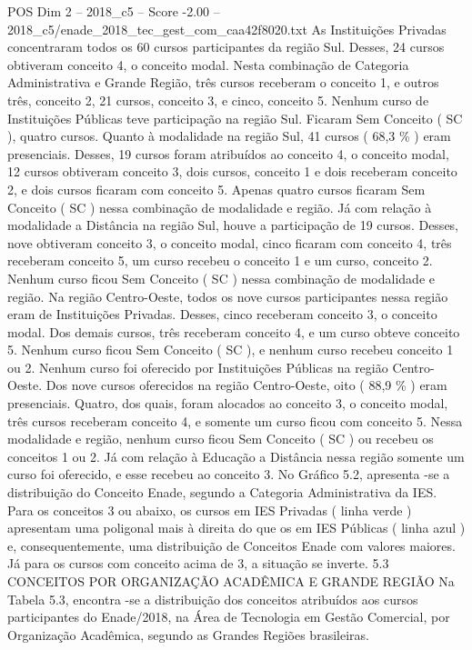 \begin{textsample}{POS Dim 2 – 2018\_c5 – Score -2.00 – 2018\_c5/enade\_2018\_tec\_gest\_com\_caa42f8020.txt}
As Instituições Privadas concentraram todos os 60 cursos participantes da região Sul.
Desses, 24 cursos obtiveram conceito 4, o conceito modal.
Nesta combinação de Categoria Administrativa e Grande Região, três cursos receberam o conceito 1, e outros três, conceito 2, 21 cursos, conceito 3, e cinco, conceito 5.
Nenhum curso de Instituições Públicas teve participação na região Sul.
Ficaram Sem Conceito ( SC ), quatro cursos.
Quanto à modalidade na região Sul, 41 cursos ( 68,3 \% ) eram presenciais.
Desses, 19 cursos foram atribuídos ao conceito 4, o conceito modal, 12 cursos obtiveram conceito 3, dois cursos, conceito 1 e dois receberam conceito 2, e dois cursos ficaram com conceito 5.
Apenas quatro cursos ficaram Sem Conceito ( SC ) nessa combinação de modalidade e região.
Já com relação à modalidade a Distância na região Sul, houve a participação de 19 cursos.
Desses, nove obtiveram conceito 3, o conceito modal, cinco ficaram com conceito 4, três receberam conceito 5, um curso recebeu o conceito 1 e um curso, conceito 2.
Nenhum curso ficou Sem Conceito ( SC ) nessa combinação de modalidade e região.
Na região Centro-Oeste, todos os nove cursos participantes nessa região eram de Instituições Privadas.
Desses, cinco receberam conceito 3, o conceito modal.
Dos demais cursos, três receberam conceito 4, e um curso obteve conceito 5.
Nenhum curso ficou Sem Conceito ( SC ), e nenhum curso recebeu conceito 1 ou 2.
Nenhum curso foi oferecido por Instituições Públicas na região Centro-Oeste.
Dos nove cursos oferecidos na região Centro-Oeste, oito ( 88,9 \% ) eram presenciais.
Quatro, dos quais, foram alocados ao conceito 3, o conceito modal, três cursos receberam conceito 4, e somente um curso ficou com conceito 5.
Nessa modalidade e região, nenhum curso ficou Sem Conceito ( SC ) ou recebeu os conceitos 1 ou 2.
Já com relação à Educação a Distância nessa região somente um curso foi oferecido, e esse recebeu ao conceito 3.
No Gráfico 5.2, apresenta -se a distribuição do Conceito Enade, segundo a Categoria Administrativa da IES.
Para os conceitos 3 ou abaixo, os cursos em IES Privadas ( linha verde ) apresentam uma poligonal mais à direita do que os em IES Públicas ( linha azul ) e, consequentemente, uma distribuição de Conceitos Enade com valores maiores.
Já para os cursos com conceito acima de 3, a situação se inverte. 5.3 CONCEITOS POR ORGANIZAÇÃO ACADÊMICA E GRANDE REGIÃO Na Tabela 5.3, encontra -se a distribuição dos conceitos atribuídos aos cursos participantes do Enade/2018, na Área de Tecnologia em Gestão Comercial, por Organização Acadêmica, segundo as Grandes Regiões brasileiras.

\end{textsample}
